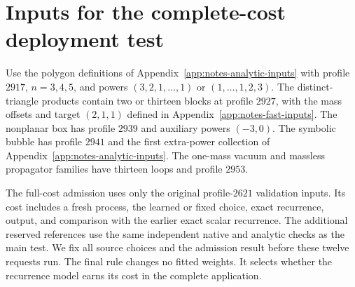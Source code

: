 \section{Inputs for the complete-cost deployment test}
\label{app:notes-fast-deployment}
Use the polygon definitions of Appendix~\ref{app:notes-analytic-inputs} with profile $2917$, $n=3,4,5$, and powers $(3,2,1,\ldots,1)$ or $(1,\ldots,1,2,3)$. The distinct-triangle products contain two or thirteen blocks at profile $2927$, with the mass offsets and target $(2,1,1)$ defined in Appendix~\ref{app:notes-fast-inputs}. The nonplanar box has profile $2939$ and auxiliary powers $(-3,0)$. The symbolic bubble has profile $2941$ and the first extra-power collection of Appendix~\ref{app:notes-analytic-inputs}. The one-mass vacuum and massless propagator families have thirteen loops and profile $2953$.

The full-cost admission uses only the original profile-$2621$ validation inputs. Its cost includes a fresh process, the learned or fixed choice, exact recurrence, output, and comparison with the earlier exact scalar recurrence. The additional reserved references use the same independent native and analytic checks as the main test. We fix all source choices and the admission result before these twelve requests run. The final rule changes no fitted weights. It selects whether the recurrence model earns its cost in the complete application.
